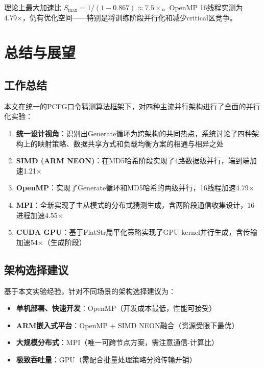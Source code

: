 \documentclass[12pt,a4paper]{ctexart}
\begin{document}
理论上最大加速比 $S_{\text{max}} = 1 / (1 - 0.867) \approx 7.5\times$。OpenMP 16线程实测为4.79×，仍有优化空间——特别是将训练阶段并行化和减少critical区竞争。

\section{总结与展望}

\subsection{工作总结}

本文在统一的PCFG口令猜测算法框架下，对四种主流并行架构进行了全面的并行化实验：

\begin{enumerate}[nosep]
    \item \textbf{统一设计视角}：识别出Generate循环为跨架构的共同热点，系统讨论了四种架构上的映射策略、数据共享方式和负载均衡方案的相通与相异之处
    \item \textbf{SIMD (ARM NEON)}：在MD5哈希阶段实现了4路数据级并行，端到端加速1.21×
    \item \textbf{OpenMP}：实现了Generate循环和MD5哈希的两级并行，16线程加速4.79×
    \item \textbf{MPI}：全新实现了主从模式的分布式猜测生成，含两阶段通信收集设计，16进程加速4.55×
    \item \textbf{CUDA GPU}：基于FlatStr扁平化策略实现了GPU kernel并行生成，含传输加速54×（生成阶段）
\end{enumerate}

\subsection{架构选择建议}

基于本文实验经验，针对不同场景的架构选择建议为：

\begin{itemize}[nosep]
    \item \textbf{单机部署、快速开发}：OpenMP（开发成本最低，性能可接受）
    \item \textbf{ARM嵌入式平台}：OpenMP + SIMD NEON融合（资源受限下最优）
    \item \textbf{大规模分布式}：MPI（唯一可跨节点方案，需注意通信-计算比）
    \item \textbf{极致吞吐量}：GPU（需配合批量处理策略分摊传输开销）
\end{itemize}
\end{document}
